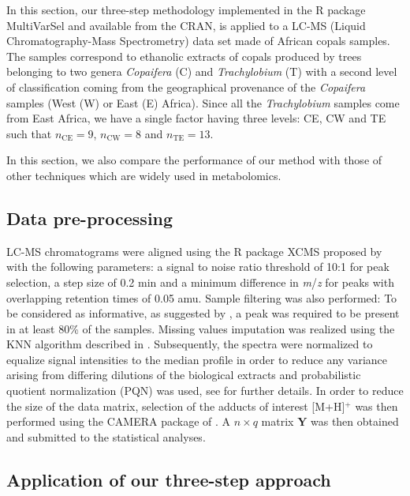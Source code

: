 In this section, our three-step methodology implemented in the R package \textsf{MultiVarSel} and available from the CRAN, 
is applied to a LC-MS (Liquid Chromatography-Mass Spectrometry) data set made of African copals samples. 
The samples correspond to  ethanolic extracts of copals produced by trees belonging to two genera \textit{Copaifera} (C) and \textit{Trachylobium} (T) with a second level of classification coming 
from the geographical provenance of the \textit{Copaifera} samples (West (W) or East (E) Africa). Since all the \textit{Trachylobium} samples come from East Africa, we have a single factor
having three levels: CE, CW and TE such that $n_{\textrm{CE}}=9$, $n_{\textrm{CW}}=8$ and $n_{\textrm{TE}}=13$.

In this section, we also compare the performance of our method with those of other techniques which are widely used in metabolomics. 


\subsection{Data pre-processing}

LC-MS chromatograms were aligned using the R package
XCMS proposed by \cite{Smith2006} with the following parameters: a signal to noise
ratio threshold of 10:1 for peak selection,  a step size of 0.2 min
and a minimum difference in \textit{m}/\textit{z} for peaks with
overlapping retention times of 0.05 amu. 
Sample filtering was also performed: To be considered as informative, as suggested by \cite{Kirwan2013}, a peak was required to be present in at least 80\% of the samples. 
Missing values imputation was realized using the KNN algorithm described in \cite{Hrydziuszko2012}.
Subsequently, the spectra were normalized to equalize signal
intensities to the median profile in order to reduce any variance
arising from differing dilutions of the biological extracts and
probabilistic quotient normalization (PQN) was used, see
\cite{Dieterle2006} for further details. In order to reduce the size of the data matrix,
selection of the adducts of interest [M+H]$^{+}$ was then performed 
using the CAMERA package of \cite{Kuhl2012}. A $n\times q$ matrix $\boldsymbol{Y}$ was then obtained and submitted to the statistical analyses.

\subsection{Application of our three-step approach}

